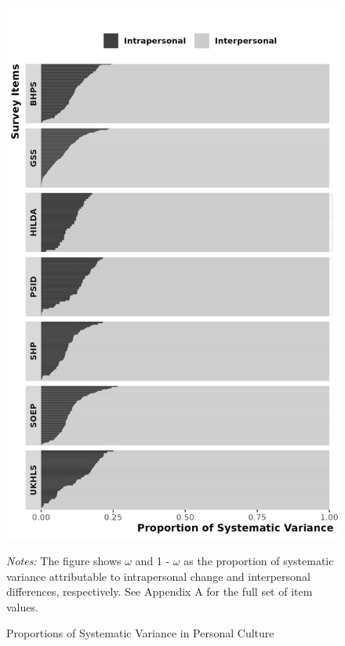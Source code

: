 \documentclass[
  12pt,
]{article}
\begin{document}
\begin{figure}[ht]
\caption{Proportions of Systematic Variance in Personal Culture}

\begin{center}\includegraphics[width=20.83in]{../figures/figure_1_bw} \end{center}

\textit{Notes:} The figure shows $\omega$ and 1 - $\omega$ as the proportion of systematic variance attributable to intrapersonal change and interpersonal differences, respectively. See Appendix A for the full set of item values. 
\end{figure}

\newpage
\end{document}
